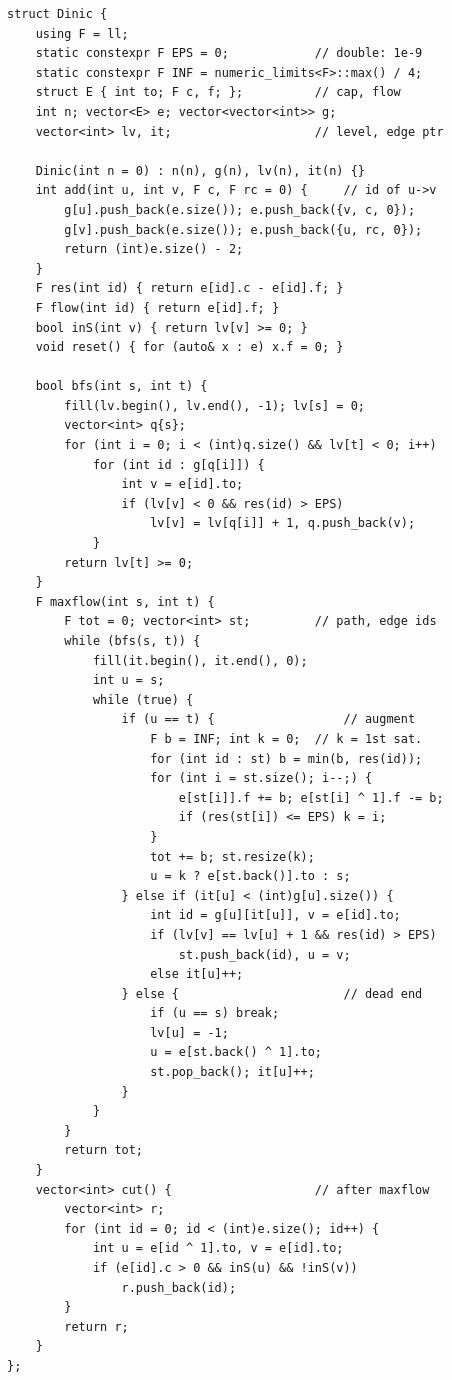 \begin{lstlisting}
struct Dinic {
    using F = ll;
    static constexpr F EPS = 0;            // double: 1e-9
    static constexpr F INF = numeric_limits<F>::max() / 4;
    struct E { int to; F c, f; };          // cap, flow
    int n; vector<E> e; vector<vector<int>> g;
    vector<int> lv, it;                    // level, edge ptr

    Dinic(int n = 0) : n(n), g(n), lv(n), it(n) {}
    int add(int u, int v, F c, F rc = 0) {     // id of u->v
        g[u].push_back(e.size()); e.push_back({v, c, 0});
        g[v].push_back(e.size()); e.push_back({u, rc, 0});
        return (int)e.size() - 2;
    }
    F res(int id) { return e[id].c - e[id].f; }
    F flow(int id) { return e[id].f; }
    bool inS(int v) { return lv[v] >= 0; }
    void reset() { for (auto& x : e) x.f = 0; }

    bool bfs(int s, int t) {
        fill(lv.begin(), lv.end(), -1); lv[s] = 0;
        vector<int> q{s};
        for (int i = 0; i < (int)q.size() && lv[t] < 0; i++)
            for (int id : g[q[i]]) {
                int v = e[id].to;
                if (lv[v] < 0 && res(id) > EPS)
                    lv[v] = lv[q[i]] + 1, q.push_back(v);
            }
        return lv[t] >= 0;
    }
    F maxflow(int s, int t) {
        F tot = 0; vector<int> st;         // path, edge ids
        while (bfs(s, t)) {
            fill(it.begin(), it.end(), 0);
            int u = s;
            while (true) {
                if (u == t) {                  // augment
                    F b = INF; int k = 0;  // k = 1st sat.
                    for (int id : st) b = min(b, res(id));
                    for (int i = st.size(); i--;) {
                        e[st[i]].f += b; e[st[i] ^ 1].f -= b;
                        if (res(st[i]) <= EPS) k = i;
                    }
                    tot += b; st.resize(k);
                    u = k ? e[st.back()].to : s;
                } else if (it[u] < (int)g[u].size()) {
                    int id = g[u][it[u]], v = e[id].to;
                    if (lv[v] == lv[u] + 1 && res(id) > EPS)
                        st.push_back(id), u = v;
                    else it[u]++;
                } else {                       // dead end
                    if (u == s) break;
                    lv[u] = -1;
                    u = e[st.back() ^ 1].to;
                    st.pop_back(); it[u]++;
                }
            }
        }
        return tot;
    }
    vector<int> cut() {                    // after maxflow
        vector<int> r;
        for (int id = 0; id < (int)e.size(); id++) {
            int u = e[id ^ 1].to, v = e[id].to;
            if (e[id].c > 0 && inS(u) && !inS(v))
                r.push_back(id);
        }
        return r;
    }
};
\end{lstlisting}

